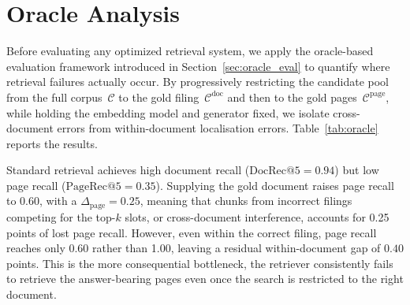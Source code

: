\documentclass[12pt,twoside,maitrise]{dms}
\theoremstyle{definition}
\numberwithin{equation}{section}
\numberwithin{table}{chapter}
\numberwithin{figure}{chapter}
\begin{document}
\section{Oracle Analysis}
\label{sec:oracle_results}

Before evaluating any optimized retrieval system, we apply the oracle-based evaluation
framework introduced in Section~\ref{sec:oracle_eval} to quantify where retrieval failures
actually occur. By progressively restricting the candidate pool from the full
corpus~$\mathcal{C}$ to the gold filing~$\mathcal{C}^{\mathrm{doc}}$ and then to the
gold pages~$\mathcal{C}^{\mathrm{page}}$, while holding the embedding model and
generator fixed, we isolate cross-document errors from within-document localisation
errors. Table~\ref{tab:oracle} reports the results.

\begin{table}[ht]
\centering
\caption{Oracle retrieval results at $k=5$ using BGE-M3. Numeric match is drawn
  from the downstream generation evaluation in Table~\ref{tab:gen_overall}.}
\label{tab:oracle}

\end{table}

Standard retrieval achieves high document recall ($\text{DocRec@5} = 0.94$) but low page recall ($\text{PageRec@5} = 0.35$). Supplying the gold document
raises page recall to $0.60$, with a $\Delta_{\mathrm{page}} = 0.25$, meaning that chunks from incorrect filings competing for the top-$k$
slots, or cross-document interference, accounts for 0.25 points of lost page recall. However, even within the
correct filing, page recall reaches only 0.60 rather than 1.00, leaving a residual
within-document gap of $0.40$ points. This is the more consequential bottleneck, the
retriever consistently fails to retrieve the answer-bearing pages even once the search is
restricted to the right document.
\end{document}

